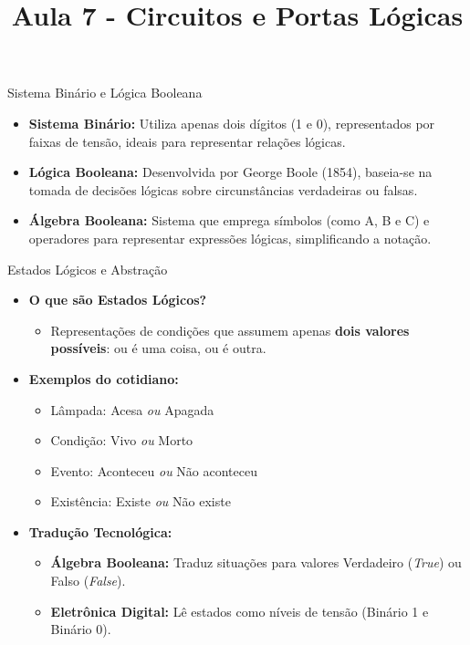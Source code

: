\title{Aula 7 - Circuitos e Portas Lógicas}



\begin{frame}
    \titlepage
\end{frame}


\begin{frame}{Sistema Binário e Lógica Booleana}
    \begin{itemize}
        \item \textbf{Sistema Binário:} Utiliza apenas dois dígitos (1 e 0), representados por faixas de tensão, ideais para representar relações lógicas.
        \item \textbf{Lógica Booleana:} Desenvolvida por George Boole (1854), baseia-se na tomada de decisões lógicas sobre circunstâncias verdadeiras ou falsas.
        \item \textbf{Álgebra Booleana:} Sistema que emprega símbolos (como A, B e C) e operadores para representar expressões lógicas, simplificando a notação.
    \end{itemize}
\end{frame}

\begin{frame}{Estados Lógicos e Abstração}
    \begin{itemize}
        \item \textbf{O que são Estados Lógicos?}
              \begin{itemize}
                  \item Representações de condições que assumem apenas \textbf{dois valores possíveis}: ou é uma coisa, ou é outra.
              \end{itemize}

        \item \textbf{Exemplos do cotidiano:}
              \begin{itemize}
                  \item Lâmpada: Acesa \textit{ou} Apagada
                  \item Condição: Vivo \textit{ou} Morto
                  \item Evento: Aconteceu \textit{ou} Não aconteceu
                  \item Existência: Existe \textit{ou} Não existe
              \end{itemize}

        \item \textbf{Tradução Tecnológica:}
              \begin{itemize}
                  \item \textbf{Álgebra Booleana:} Traduz situações para valores Verdadeiro (\textit{True}) ou Falso (\textit{False}).
                  \item \textbf{Eletrônica Digital:} Lê estados como níveis de tensão (Binário 1 e Binário 0).
              \end{itemize}
    \end{itemize}
\end{frame}

